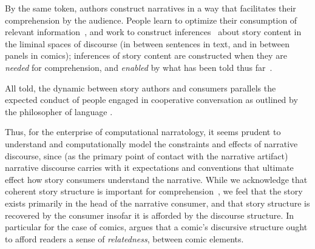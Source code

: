 By the same token, authors construct narratives in a way that
facilitates their comprehension by the audience. People learn to optimize 
their consumption of relevant information~\cite{pirolli2007information}, 
and work to construct inferences~\cite{magliano2016filling} about story 
content in the liminal spaces of discourse (in between sentences in text, 
and in between panels in comics); inferences of story content are 
constructed when they are \emph{needed} for comprehension, and 
\emph{enabled} by what has been told thus far~\cite{myers1987degree}.

All told, the dynamic between story authors and consumers parallels the
expected conduct of people engaged in cooperative conversation as outlined
by the philosopher of language .


Thus, for the enterprise of computational narratology, it seems prudent to
understand and computationally model the constraints and effects of narrative
discourse, since (as the primary point of contact with the narrative artifact) 
narrative discourse carries with it expectations and conventions that ultimate
effect how story consumers understand the narrative. While we 
acknowledge that coherent story structure is important for 
comprehension~\cite{graesser2002how}, we feel that the story exists primarily
in the head of the narrative consumer, and that story structure is recovered 
by the consumer insofar it is afforded by the discourse structure. In particular
for the case of comics,  argues that a comic's
discursive structure ought to afford readers a sense of \emph{relatedness}, 
between comic elements.





